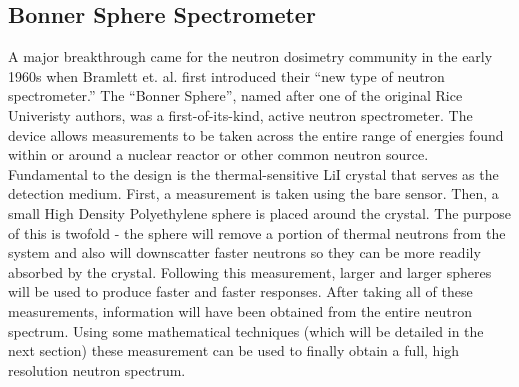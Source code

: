 \subsection{Bonner Sphere Spectrometer}
A major breakthrough came for the neutron dosimetry community in the early 1960s when Bramlett et. al. first introduced their ``new type of neutron spectrometer.''
The ``Bonner Sphere'', named after one of the original Rice Univeristy authors, was a first-of-its-kind, active neutron spectrometer.
The device allows measurements to be taken across the entire range of energies found within or around a nuclear reactor or other common neutron source.
Fundamental to the design is the thermal-sensitive LiI crystal that serves as the detection medium.
First, a measurement is taken using the bare sensor.
Then, a small High Density Polyethylene sphere is placed around the crystal.
The purpose of this is twofold - the sphere will remove a portion of thermal neutrons from the system and also will downscatter faster neutrons so they can be more readily absorbed by the crystal.
Following this measurement, larger and larger spheres will be used to produce faster and faster responses.
After taking all of these measurements, information will have been obtained from the entire neutron spectrum.
Using some mathematical techniques (which will be detailed in the next section) these measurement can be used to finally obtain a full, high resolution neutron spectrum.

